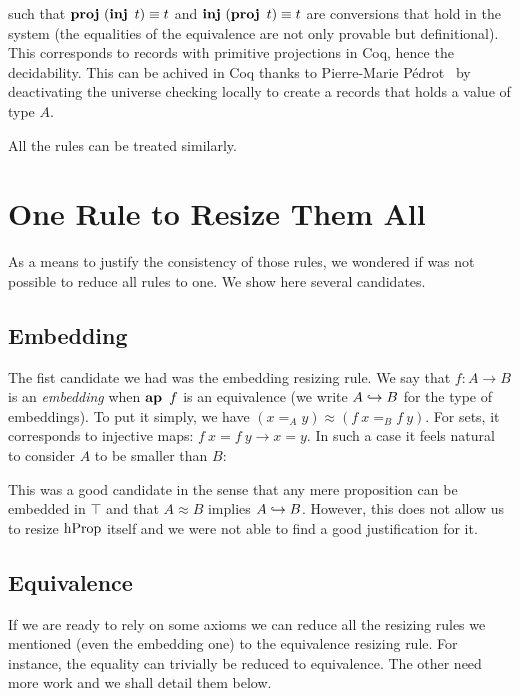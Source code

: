 \documentclass[11pt]{article}
\theoremstyle{plain}
\theoremstyle{remark}
\begin{document}
\begin{mathc}
  \qquad
\end{mathc}
%
\noindent
such that $\operatorname{\mathbf{proj}}\ (\operatorname{\mathbf{inj}}\ t) \equiv t$ and $\operatorname{\mathbf{inj}}\ (\operatorname{\mathbf{proj}}\ t) \equiv t$ are
conversions that hold in the system (the equalities of the equivalence are not
only provable but definitional).
This corresponds to records with primitive projections in Coq, hence the
decidability.
%
This can be achived in Coq thanks to Pierre-Marie Pédrot~\cite{pperdot:pr} by
deactivating the universe checking locally to create a records that holds a
value of type $A$.

All the rules can be treated similarly.


\section{One Rule to Resize Them All}

As a means to justify the consistency of those rules, we wondered if was not
possible to reduce all rules to one. We show here several candidates.

\subsection{Embedding}
The fist candidate we had was the embedding resizing rule.
We say that $f : A \to B$  is an \emph{embedding} when $\operatorname{\mathbf{ap}}\ f$ is an
equivalence (we write $A \hookrightarrow B$ for the type of embeddings).
To put it simply, we have $(x =_A y) \approx (f\ x =_B f\ y)$.
For sets, it corresponds to injective maps:
$f\ x = f\ y \to x = y$.
In such a case it feels natural to consider $A$ to be smaller than $B$:

\begin{mathc}
\end{mathc}

\noindent
This was a good candidate in the sense that any mere proposition can be embedded
in $\top$ and that $A \approx B$ implies $A \hookrightarrow B$.
However, this does not allow us to resize $\operatorname{hProp}$ itself and we were not able
to find a good justification for it.

\subsection{Equivalence}
If we are ready to rely on some axioms we can reduce all the resizing rules we
mentioned (even the embedding one) to the equivalence resizing rule.
For instance, the equality can trivially be reduced to equivalence.
The other need more work and we shall detail them below.
\end{document}
